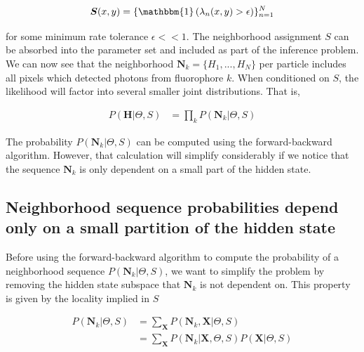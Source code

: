 \documentclass{ucetd}
\begin{document}
\begin{equation*}
\bm{S}(x,y) =  \{\mathbbm{1}\left(\lambda_{n}(x,y) > \epsilon\right)\}_{n=1}^{N}
\end{equation*}
 
for some minimum rate tolerance $\epsilon << 1$. The neighborhood assignment $S$ can be absorbed into the parameter set and included as part of the inference problem. We can now see that the neighborhood $\bm{N}_{k} = \{H_{1},...,H_{N}\}$ per particle includes all pixels which detected photons from fluorophore $k$. When conditioned on $S$, the likelihood will factor into several smaller joint distributions. That is,

\begin{align*}
P(\bm{H}|\Theta,S) &= \prod_{k}P(\bm{N}_{k}|\Theta,S)
\end{align*}

The probability $P(\bm{N}_{k}|\Theta,S)$ can be computed using the forward-backward algorithm. However, that calculation will simplify considerably if we notice that the sequence $\bm{N}_{k}$ is only dependent on a small part of the hidden state.

\subsection{Neighborhood sequence probabilities depend only on a small partition of the hidden state}

Before using the forward-backward algorithm to compute the probability of a neighborhood sequence $P(\bm{N}_{k}|\Theta,S)$, we want to simplify the problem by removing the hidden state subspace that $\bm{N}_{k}$ is not dependent on. This property is given by the locality implied in $S$

\begin{align*}
P(\bm{N}_{k}|\Theta,S) &= \sum_{\bm{X}}P(\bm{N}_{k},\bm{X}|\Theta,S) \\
&= \sum_{\bm{X}}P(\bm{N}_{k}|\bm{X},\Theta,S)P(\bm{X}|\Theta,S)
\end{align*}
\end{document}
